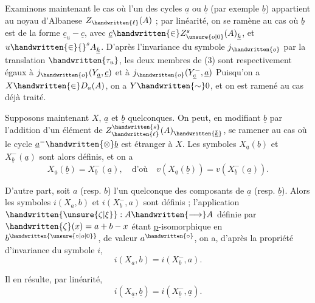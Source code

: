
Examinons maintenant le cas où l'un des cycles $\underline{a}$ ou $\underline{b}$ (par exemple $\underline{b}$) appartient au noyau d'Albanese $Z_{\handwritten{\ell}}(A)$ ; par linéarité, on se ramène au cas où $\underline{b}$ est de la forme $\underline{c}_u-\underline{c}$, avec $\underline{c}\handwritten{\in}Z^{s}_{\unsure{o|0}}(A)_{\bar{\underline{k}}}$, et $u\handwritten{\in}{}^{s}A_{\bar{\underline{k}}}$. D'après l'invariance du symbole $j_{\handwritten{o}}$ par la translation $\handwritten{\tau_u}$, les deux membres de (3) sont respectivement égaux à $j_{\handwritten{o}}(Y_{\underline{a}},\underline{c})$ et à $j_{\handwritten{o}}(Y^{-}_{\underline{c}},\underline{a})$  Puisqu'on a $X\handwritten{\in}D_a(A)$, on a $Y\handwritten{\sim}0$, et on est ramené au cas déjà traité.

Supposons maintenant $X$, $\underline{a}$ et $\underline{b}$ quelconques. On peut, en modifiant $\underline{b}$ par l'addition d'un élément de $Z^{\handwritten{s}}_{\handwritten{\ell}}(A)_{\handwritten{\bar{\underline{k}}}}$, se ramener au cas où le cycle $\underline{a}^{-}\handwritten{\otimes}\underline{b}$ est étranger à $X$. Les symboles $X_{\underline{a}}(\underline{b})$ et $X^{-}_{\underline{b}}(\underline{a})$ sont alors définis, et on a
\[
X_{\underline{a}}(\underline{b})=X^{-}_{\underline{b}}(\underline{a}),\quad\text{d'où}\quad v(X_{\underline{a}}(\underline{b}))=v(X^{-}_{\underline{b}}(\underline{a})).
\]

D'autre part, soit $a$ (resp. $b$) l'un quelconque des composants de $\underline{a}$ (resp. $\underline{b}$). Alors les symboles $i(X_a,b)$ et $i(X^{-}_b,a)$ sont définis ; l'application $\handwritten{\unsure{\zeta|\xi}}:A\handwritten{\longrightarrow}A$ définie par $\handwritten{\zeta}(x)=a+b-x$ étant \uline{p}-isomorphique en $b^{\handwritten{\unsure{\circ|o|0}}}$, de valeur $a^{\handwritten{\circ}}$, on a, d'après la propriété d'invariance du symbole $i$,
\[
i(X_a,b)=i(X^{-}_b,a).
\]

Il en résulte, par linéarité,
\[
i(X_{\underline{a}},\underline{b})=i(X^{-}_{\underline{b}},\underline{a}).
\]

